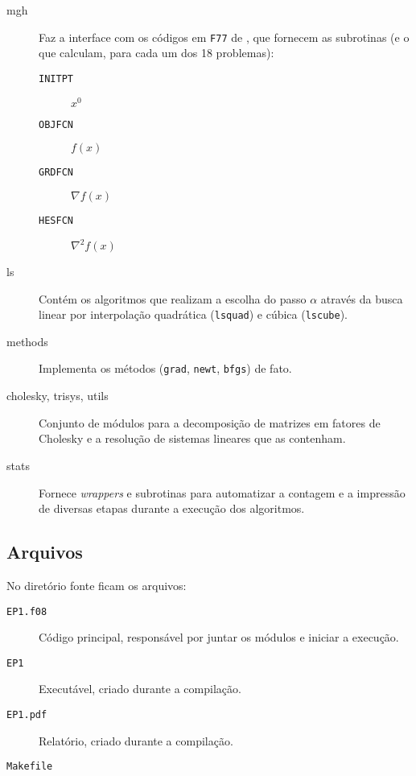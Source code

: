 \documentclass[a4paper,11pt]{article}
\begin{document}
            \begin{description}
                \item[mgh] Faz a interface com os códigos em \texttt{F77} de \citep*{More:1981:AFS:355934.355943}, que fornecem as subrotinas (e o que calculam, para cada um dos 18 problemas):
                    \begin{description}
                        \item[\texttt{INITPT}] $x^0$
                        \item[\texttt{OBJFCN}] $f(x)$
                        \item[\texttt{GRDFCN}] $\nabla f(x)$
                        \item[\texttt{HESFCN}] $\nabla^2 f(x)$
                    \end{description}

                \item[ls] Contém os algoritmos que realizam a escolha do passo $\alpha$ através da busca linear por interpolação quadrática (\texttt{lsquad}) e cúbica (\texttt{lscube}).
                \item[methods] Implementa os métodos (\texttt{grad}, \texttt{newt}, \texttt{bfgs}) de fato.
                \item[cholesky, trisys, utils] Conjunto de módulos para a decomposição de matrizes em fatores de Cholesky e a resolução de sistemas lineares que as contenham.
                \item[stats] Fornece \emph{wrappers} e subrotinas para automatizar a contagem e a impressão de diversas etapas durante a execução dos algoritmos.
            \end{description}

        \subsection*{Arquivos}
            No diretório fonte ficam os arquivos:
            \begin{description}
                \item[\texttt{EP1.f08}] Código principal, responsável por juntar os módulos e iniciar a execução.
                \item[\texttt{EP1}] Executável, criado durante a compilação.
                \item[\texttt{EP1.pdf}] Relatório, criado durante a compilação.
                \item[\texttt{Makefile}]
            \end{description}
\end{document}
